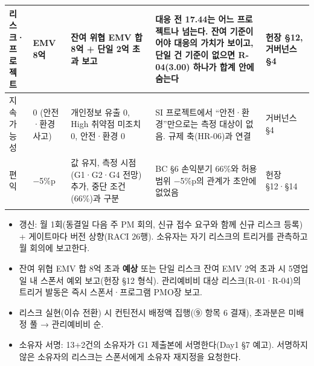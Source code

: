 \documentclass[10pt,a4paper]{article}
\begin{document}
{\begin{longtable}{|L{26mm}|L{44mm}|L{50mm}|L{92mm}|L{40mm}|}
리스크·프로젝트 & EMV 8억 & 잔여 위협 EMV 합 8억 + 단일 2억 초과 보고 & 대응 전 17.44는 어느 프로젝트나 넘는다. 잔여 기준이어야 대응의 가치가 보이고, 단일 건 기준이 없으면 R-04(3.00) 하나가 합계 안에 숨는다 & 헌장 §12, 거버넌스 §4 \\ \hline
지속가능성 & 0 (안전·환경 사고) & 개인정보 유출 0, High 취약점 미조치 0, 안전·환경 0 & SI 프로젝트에서 “안전·환경”만으로는 측정 대상이 없음. 규제 축(HR-06)과 연결 & 거버넌스 §4 \\ \hline
편익 & −5\%p & 값 유지, 측정 시점(G1·G2·G4 전망) 추가, 중단 조건(66\%)과 구분 & BC §6 손익분기 66\%와 허용범위 −5\%p의 관계가 초안에 없었음 & 헌장 §12·§14 \\ \hline
\fi
\end{longtable}}
\landscapeoff

\begin{fieldbox}
\ifwbblank
{}\par\vspace{4mm}
\par\vspace{4mm}
\par\vspace{4mm}
\par\vspace{4mm}
\par\vspace{4mm}
\par\vspace{4mm}
\par
\else
\begin{itemize}
\item 갱신: 월 1회(동결일 다음 주 PM 회의, 신규 접수 요구와 함께 신규 리스크 등록) + 게이트마다 버전 상향(RACI 26행). 소유자는 자기 리스크의 트리거를 관측하고 월 회의에 보고한다.
\item 잔여 위협 EMV 합 8억 초과 \textbf{예상} 또는 단일 리스크 잔여 EMV 2억 초과 시 5영업일 내 스폰서 예외 보고(헌장 §12 형식). 관리예비비 대상 리스크(R-01·R-04)의 트리거 발동은 즉시 스폰서·프로그램 PMO장 보고.
\item 리스크 실현(이슈 전환) 시 컨틴전시 배정액 집행(⑨ 항목 6 결재), 초과분은 미배정 풀 → 관리예비비 순.
\item 소유자 서명: 13+2건의 소유자가 G1 제출본에 서명한다(Day1 §7 예고). 서명하지 않은 소유자의 리스크는 스폰서에게 소유자 재지정을 요청한다.
\end{itemize}\fi
\end{fieldbox}
\end{document}
